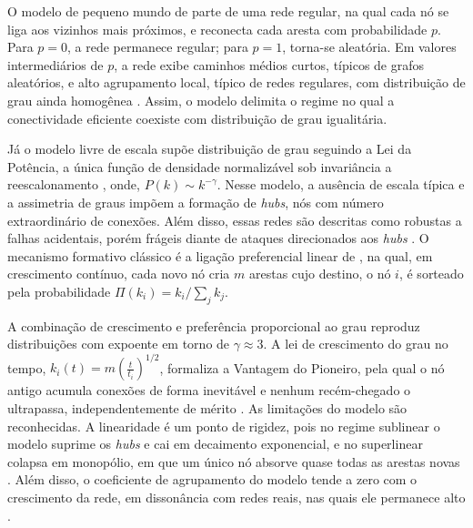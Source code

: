 \documentclass[12pt,oneside,a4paper,brazil,sumario=tradicional]{abntex2}
\begin{document}
O modelo de pequeno mundo de \textcite{watts1998} parte de uma rede regular, na qual cada nó se liga aos vizinhos mais próximos, e reconecta cada aresta com probabilidade $p$. Para $p = 0$, a rede permanece regular; para $p = 1$, torna-se aleatória. Em valores intermediários de $p$, a rede exibe caminhos médios curtos, típicos de grafos aleatórios, e alto agrupamento local, típico de redes regulares, com distribuição de grau ainda homogênea \parencite{latora2017}. Assim, o modelo delimita o regime no qual a conectividade eficiente coexiste com distribuição de grau igualitária.

Já o modelo livre de escala supõe distribuição de grau seguindo a Lei da Potência, a única função de densidade normalizável sob invariância a reescalonamento \parencite{albert2002, newman2005}, onde, $P(k) \sim k^{-\gamma}$.
Nesse modelo, a ausência de escala típica e a assimetria de graus impõem a formação de \textit{hubs}, nós com número extraordinário de conexões. Além disso, essas redes são descritas como robustas a falhas acidentais, porém frágeis diante de ataques direcionados aos \textit{hubs} \parencite{newman2003, wang2003}. O mecanismo formativo clássico é a ligação preferencial linear de \textcite{barabasi1999}, na qual, em crescimento contínuo, cada novo nó cria $m$ arestas cujo destino, o nó $i$, é sorteado pela probabilidade $\Pi(k_{i}) = k_{i} / \sum_{j} k_{j}$.

A combinação de crescimento e preferência proporcional ao grau reproduz distribuições com expoente em torno de $\gamma \approx 3$. A lei de crescimento do grau no tempo, $k_{i}(t) = m \left(\frac{t}{t_{i}}\right)^{1/2}$, formaliza a Vantagem do Pioneiro, pela qual o nó antigo acumula conexões de forma inevitável e nenhum recém-chegado o ultrapassa, independentemente de mérito \parencite{barabasi1999b}. As limitações do modelo são reconhecidas. A linearidade é um ponto de rigidez, pois no regime sublinear o modelo suprime os \textit{hubs} e cai em decaimento exponencial, e no superlinear colapsa em monopólio, em que um único nó absorve quase todas as arestas novas \parencite{albert2002}. Além disso, o coeficiente de agrupamento do modelo tende a zero com o crescimento da rede, em dissonância com redes reais, nas quais ele permanece alto \parencite{newman2003}.
\end{document}
